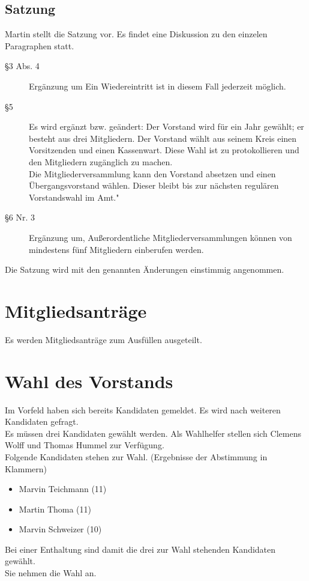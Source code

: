 \documentclass[a4paper,12pt,oneside]{scrartcl} %
\begin{document}
\subsection*{Satzung}
Martin stellt die Satzung vor. Es findet eine Diskussion zu den einzelen Paragraphen statt.
\begin{description}
\item[§3 Abs. 4]Ergänzung um \glqq Ein Wiedereintritt ist in diesem Fall jederzeit möglich.\grqq\ 
\item[§5]Es wird ergänzt bzw. geändert: \glqq Der Vorstand wird für ein Jahr gewählt; er besteht aus drei Mitgliedern. Der Vorstand wählt aus seinem Kreis einen Vorsitzenden und einen Kassenwart. Diese Wahl ist zu protokollieren und den Mitgliedern zugänglich zu machen.\grqq\ \\
\glqq Die Mitgliederversammlung kann den Vorstand absetzen und einen Übergangsvorstand wählen. Dieser bleibt bis zur nächsten regulären Vorstandswahl im Amt."
\item[§6 Nr. 3]Ergänzung um, \glqq Außerordentliche Mitgliederversammlungen können von mindestens fünf Mitgliedern einberufen werden.\grqq
\end{description} 
Die Satzung wird mit den genannten Änderungen einstimmig angenommen.

\section{Mitgliedsanträge}
Es werden Mitgliedsanträge zum Ausfüllen ausgeteilt.
\section{Wahl des Vorstands}
Im Vorfeld haben sich bereits Kandidaten gemeldet. Es wird nach weiteren Kandidaten gefragt.\\

Es müssen drei Kandidaten gewählt werden. Als Wahlhelfer stellen sich Clemens Wolff und Thomas Hummel zur Verfügung.\\
Folgende Kandidaten stehen zur Wahl. (Ergebnisse der Abstimmung in Klammern)
\begin{itemize}
\item Marvin Teichmann (11)
\item Martin Thoma (11)
\item Marvin Schweizer (10)
\end{itemize}
Bei einer Enthaltung sind damit die drei zur Wahl stehenden Kandidaten gewählt.\\
Sie nehmen die Wahl an.
\end{document}
